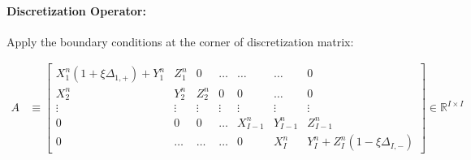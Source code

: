 \documentclass[11pt]{article}
\newcommand{\R}{\ensuremath{\mathbb{R}}}
\begin{document}
\paragraph{Discretization Operator:} Apply the boundary conditions at the corner of discretization matrix:

\begin{align}
		A &\equiv \begin{bmatrix}
	X_1^n(1+\xi\Delta_{1,+})+Y_1^n & Z_1^n & 0 & \ldots & \ldots & \ldots & 0\\
	X^n_2 & Y^n_2 & Z^n_2 & 0 & 0 & \ldots & 0\\
	\vdots & \vdots & \vdots & \vdots & \vdots & \vdots & \vdots\\		
	0 & 0 & 0 & \ldots & X^n_{I-1} & Y^n_{I-1} & Z^n_{I-1}\\
	0 & \ldots & \ldots & \ldots & 0 & X_I^n & Y_I^n+Z_I^n(1-\xi\Delta_{I,-})
\end{bmatrix}\in\R^{I\times I}\label{eq:A-n}
\end{align}
\end{document}
